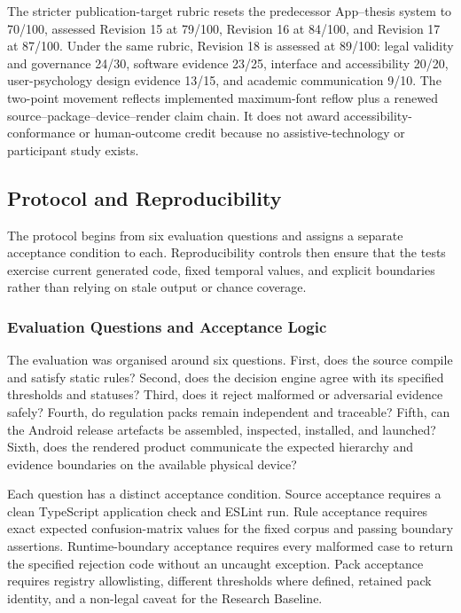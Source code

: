 The stricter publication-target rubric resets the predecessor App--thesis system to 70/100, assessed Revision 15 at 79/100, Revision 16 at 84/100, and Revision 17 at 87/100. Under the same rubric, Revision 18 is assessed at 89/100: legal validity and governance 24/30, software evidence 23/25, interface and accessibility 20/20, user-psychology design evidence 13/15, and academic communication 9/10. The two-point movement reflects implemented maximum-font reflow plus a renewed source--package--device--render claim chain. It does not award accessibility-conformance or human-outcome credit because no assistive-technology or participant study exists.

\subsection{Protocol and Reproducibility}

The protocol begins from six evaluation questions and assigns a separate acceptance condition to each. Reproducibility controls then ensure that the tests exercise current generated code, fixed temporal values, and explicit boundaries rather than relying on stale output or chance coverage.

\subsubsection{Evaluation Questions and Acceptance Logic}

The evaluation was organised around six questions. First, does the source compile and satisfy static rules? Second, does the decision engine agree with its specified thresholds and statuses? Third, does it reject malformed or adversarial evidence safely? Fourth, do regulation packs remain independent and traceable? Fifth, can the Android release artefacts be assembled, inspected, installed, and launched? Sixth, does the rendered product communicate the expected hierarchy and evidence boundaries on the available physical device?

Each question has a distinct acceptance condition. Source acceptance requires a clean TypeScript application check and ESLint run. Rule acceptance requires exact expected confusion-matrix values for the fixed corpus and passing boundary assertions. Runtime-boundary acceptance requires every malformed case to return the specified rejection code without an uncaught exception. Pack acceptance requires registry allowlisting, different thresholds where defined, retained pack identity, and a non-legal caveat for the Research Baseline.

